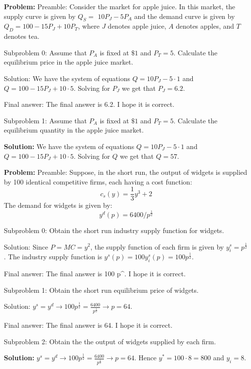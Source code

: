 \documentclass[10pt]{article}
\begin{document}
\textbf{Problem:}
Preamble: Consider the market for apple juice. In this market, the supply curve is given by $Q_{S}=$ $10 P_{J}-5 P_{A}$ and the demand curve is given by $Q_{D}=100-15 P_{J}+10 P_{T}$, where $J$ denotes apple juice, $A$ denotes apples, and $T$ denotes tea.

Subproblem 0: Assume that $P_{A}$ is fixed at $\$ 1$ and $P_{T}=5$. Calculate the equilibrium price in the apple juice market.


Solution: We have the system of equations $Q=10 P_{J}-5 \cdot 1$ and $Q=100-15 P_{J}+10 \cdot 5$. Solving for $P_{J}$ we get that $P_{J}=\boxed{6.2}$.

Final answer: The final answer is 6.2. I hope it is correct.

Subproblem 1: Assume that $P_{A}$ is fixed at $\$ 1$ and $P_{T}=5$. Calculate the equilibrium quantity in the apple juice market.


\textbf{Solution:}
We have the system of equations $Q=10 P_{J}-5 \cdot 1$ and $Q=100-15 P_{J}+10 \cdot 5$. Solving for $Q$ we get that $Q=\boxed{57}$.


\textbf{Problem:}
Preamble: Suppose, in the short run, the output of widgets is supplied by 100 identical competitive firms, each having a cost function:
\[
c_{s}(y)=\frac{1}{3} y^{3}+2
\]
The demand for widgets is given by:
\[
y^{d}(p)=6400 / p^{\frac{1}{2}}
\]

Subproblem 0: Obtain the short run industry supply function for widgets.


Solution: Since $P=M C=y^{2}$, the supply function of each firm is given by $y_{i}^{s}=p^{\frac{1}{2}}$. 
The industry supply function is $y^{s}(p)=100 y_{i}^{s}(p)=\boxed{100 p^{\frac{1}{2}}}$.

Final answer: The final answer is 100 p^{}. I hope it is correct.

Subproblem 1: Obtain the short run equilibrium price of widgets.


Solution: $y^{s}=y^{d} \longrightarrow 100 p^{\frac{1}{2}}=\frac{6400}{p^{\frac{1}{2}}} \longrightarrow p=\boxed{64}$. 

Final answer: The final answer is 64. I hope it is correct.

Subproblem 2: Obtain the the output of widgets supplied by each firm.


\textbf{Solution:}
$y^{s}=y^{d} \longrightarrow 100 p^{\frac{1}{2}}=\frac{6400}{p^{\frac{1}{2}}} \longrightarrow p=64$. Hence $y^{*}=100 \cdot 8=800$ and $y_{i}=\boxed{8}.$
\end{document}
